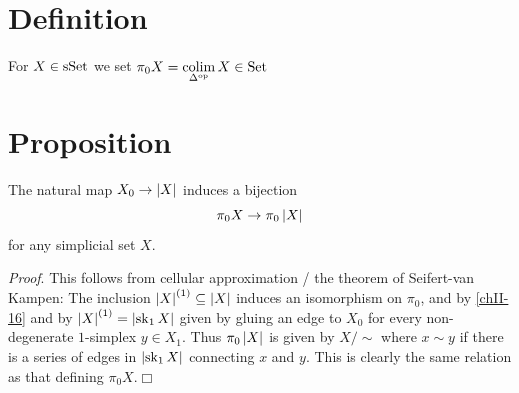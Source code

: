     \section{Definition}
        For $X \in \operatorname{sSet}$ we set $\pi_0 X = \operatorname*{colim}\limits_{\Delta^{\operatorname{op}}}X \in \operatorname{Set}$
    \section{Proposition}
        The natural map $X_0 \to \left| X \right|$ induces a bijection
        \begin{equation*}
            \pi_0 X \to \pi_0 \left| X \right|
        \end{equation*}
        for any simplicial set $X$.
        \smallskip

        \emph{Proof}. This follows from cellular approximation / the theorem of Seifert-van Kampen: The inclusion $\left| X \right|^{(1)} \subseteq \left| X \right|$ induces an isomorphism on $\pi_0$, and by \ref{chII-16} and by $\left| X \right|^{(1)} = \left| \operatorname{sk}_1 X \right|$ given by gluing an edge to $X_0$ for every non-degenerate $1$-simplex $y \in X_1$. Thus $\pi_0 \left| X \right|$ is given by ${X}/{\sim}$ where $x \sim y$ if there is a series of edges in $\left| \operatorname{sk}_1 X \right|$ connecting $x$ and $y$. This is clearly the same relation as that defining $\pi_0 X$.\hfill$\Box$
        \medskip

